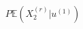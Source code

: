 \documentclass[preview]{standalone}
\begin{document}
\begin{align*}
P\mathbb{E}(X^{(r)}_2|u^{(1)})
\end{align*}
\end{document}
